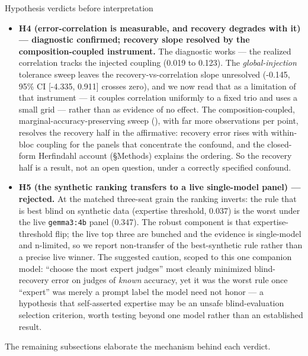 \documentclass[
  ignorenonframetext,
]{beamer}
\begin{document}
\begin{frame}{Hypothesis verdicts before
interpretation}
\begin{itemize}
  and every resolved effect is a tiny increase in error: random
  selection (+0.015), representative sortition (+0.007), and
  competence-first selection (+0.004). Single-bloc is within noise. So
  more experts do not help here, but they also do not create a material
  penalty; size is essentially neutral at this grid, and the dominant
  lever is strategy, not size.
\item
  \textbf{H4 (error-correlation is measurable, and recovery degrades
  with it) --- diagnostic confirmed; recovery slope resolved by the
  composition-coupled instrument.} The diagnostic works --- the realized
  correlation tracks the injected coupling (0.019 to 0.123). The
  \emph{global-injection} tolerance sweep leaves the
  recovery-vs-correlation slope unresolved (-0.145, 95\% CI {[}-4.335,
  0.911{]} crosses zero), and we now read that as a limitation of that
  instrument --- it couples correlation uniformly to a fixed trio and
  uses a small grid --- rather than as evidence of no effect. The
  composition-coupled, marginal-accuracy-preserving sweep
  (), with far more observations per point, resolves
  the recovery half in the affirmative: recovery error rises with
  within-bloc coupling for the panels that concentrate the confound, and
  the closed-form Herfindahl account (§Methods) explains the ordering.
  So the recovery half is a result, not an open question, under a
  correctly specified confound.
\item
  \textbf{H5 (the synthetic ranking transfers to a live single-model
  panel) --- rejected.} At the matched three-seat grain the ranking
  inverts: the rule that is best blind on synthetic data (expertise
  threshold, 0.037) is the worst under the live \texttt{gemma3:4b} panel
  (0.347). The robust component is that expertise-threshold flip; the
  live top three are bunched and the evidence is single-model and
  n-limited, so we report non-transfer of the best-synthetic rule rather
  than a precise live winner. The suggested caution, scoped to this one
  companion model: ``choose the most expert judges'' most cleanly
  minimized blind-recovery error on judges of \emph{known} accuracy, yet
  it was the worst rule once ``expert'' was merely a prompt label the
  model need not honor --- a hypothesis that self-asserted expertise may
  be an unsafe blind-evaluation selection criterion, worth testing
  beyond one model rather than an established result.
\end{itemize}

The remaining subsections elaborate the mechanism behind each verdict.
\end{frame}
\end{document}
